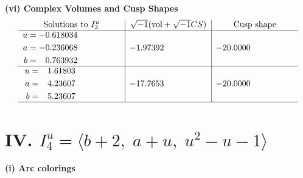 \documentclass[1p]{elsarticle_modified}
\theoremstyle{definition}
\newcommand{\I}{\sqrt{-1}}
\begin{document}
\newpage\flushleft \textbf{(vi) Complex Volumes and Cusp Shapes}
$$\begin{array}{c|c|c}  
\text{Solutions to }I^u_{3}& \I (\text{vol} + \sqrt{-1}CS) & \text{Cusp shape}\\
 \hline 
\begin{aligned}
u &= -0.618034\phantom{ +0.000000I} \\
a &= -0.236068\phantom{ +0.000000I} \\
b &= \phantom{-}0.763932\phantom{ +0.000000I}\end{aligned}
 & -1.97392\phantom{ +0.000000I} & -20.0000\phantom{ +0.000000I} \\ \hline\begin{aligned}
u &= \phantom{-}1.61803\phantom{ +0.000000I} \\
a &= \phantom{-}4.23607\phantom{ +0.000000I} \\
b &= \phantom{-}5.23607\phantom{ +0.000000I}\end{aligned}
 & -17.7653\phantom{ +0.000000I} & -20.0000\phantom{ +0.000000I}\\
 \hline 
 \end{array}$$\newpage\newpage\renewcommand{\arraystretch}{1}
\centering \section*{IV. $I^u_{4}= \langle b+2,\;a+u,\;u^2- u-1 \rangle$}
\flushleft \textbf{(i) Arc colorings}\\
\end{document}
